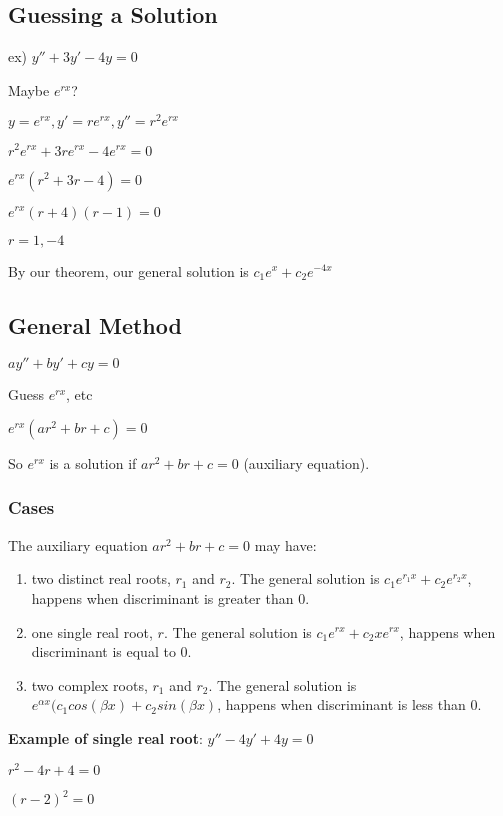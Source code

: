 \documentclass{article}
\begin{document}
\subsection{Guessing a Solution}

ex) $y''+3y'-4y=0$

Maybe $e^{rx}$?

$y=e^{rx}, y'=re^{rx}, y''=r^2 e^{rx}$

$r^2e^{rx}+3re^{rx}-4e^{rx}=0$

$e^{rx}(r^2+3r-4)=0$

$e^{rx}(r+4)(r-1)=0$

$r=1,-4$

By our theorem, our general solution is $c_1 e^x+c_2 e^{-4x}$

\subsection{General Method}

$ay''+by'+cy=0$

Guess $e^{rx}$, etc

$e^{rx}(ar^2+br+c)=0$

So $e^{rx}$ is a solution if $ar^2+br+c=0$ (auxiliary equation).

\subsubsection{Cases}

The auxiliary equation $ar^2+br+c=0$ may have:

\begin{enumerate}
    \item two distinct real roots, $r_1$ and $r_2$. The general solution is $c_1 e^{r_1 x}+c_2 e^{r_2 x}$, happens when discriminant is greater than 0.
    
    \item one single real root, $r$. The general solution is $c_1 e^{rx}+c_2 x e^{rx}$, happens when discriminant is equal to 0.
    
    \item two complex roots, $r_1$ and $r_2$. The general solution is $e^{\alpha x}(c_1 cos(\beta x) + c_2 sin(\beta x)$, happens when discriminant is less than 0.
\end{enumerate}

\textbf{Example of single real root}: $y''-4y'+4y=0$

$r^2-4r+4=0$

$(r-2)^2=0$
\end{document}
